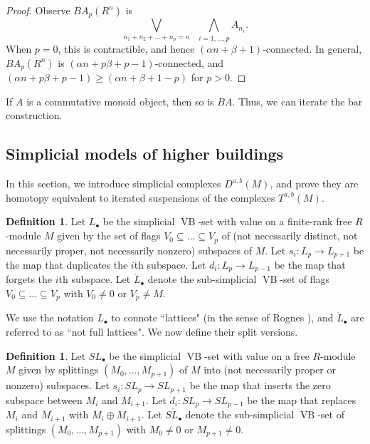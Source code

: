 \documentclass[a4paper]{amsart}
\DeclareMathOperator{\VB}{VB}
\newcommand{\m}{\to}
\numberwithin{theoremcounter}{section}
\theoremstyle{definition}
\newtheorem{definition}[Defauto]{Definition}
\theoremstyle{remark}
\begin{document}
\begin{proof} Observe $BA_{p}(R^n)$ is 
$$ \bigvee_{n_1 + n_2+ \dots + n_p=n} \; \; \bigwedge_{i=1, \dots, p} A_{n_i}.$$
When $p=0$, this is contractible, and hence $(\alpha n+\beta+1)$-connected. In general, $BA_{p}(R^n)$  is  $(\alpha n+p\beta+p-1)$-connected, and $(\alpha n+p\beta+p-1) \geq (\alpha n+\beta+1-p)$ for $p>0$. 
\end{proof} 


If $A$ is a commutative monoid object, then so is $BA$. Thus, we can iterate the bar construction.



\subsection{Simplicial models of higher buildings}

In this section, we introduce simplicial complexes $D^{a,b}(M)$, and prove they are homotopy equivalent to iterated suspensions of the complexes $T^{a,b}(M)$.
\begin{definition}
Let $L_\bullet$ be the simplicial $\VB$-set with value on a finite-rank free $R$-module $M$ given by the set of flags $V_0 \subseteq \dots \subseteq V_p $ of (not necessarily distinct, not necessarily proper, not necessarily nonzero) subspaces of $M$. Let $s_i\colon L_p \m L_{p+1}$ be the map that duplicates the $i$th subspace. Let $d_i\colon L_p \m L_{p-1}$ be the map that forgets the $i$th subspace.  Let $\mathring{L}_\bullet$ denote the sub-simplicial $\VB$-set of flags $V_0 \subseteq \dots \subseteq V_p $ with $V_0 \neq 0$ or $V_p \neq M$.  
\end{definition}

We use the notation $L_\bullet$ to connote ``lattices"  (in the sense of Rognes \cite{Rog1}), and $\mathring{L}_\bullet$  are referred to as ``not full lattices". We now define their split versions. 

\begin{definition}
Let $SL_\bullet$ be the simplicial $\VB$-set with value on a free $R$-module $M$ given by splittings $(M_0 , \dots , M_{p+1})$ of $M$ into (not necessarily proper or nonzero) subspaces. Let $s_i\colon SL_p \m SL_{p+1}$ be the map that inserts the zero subspace between $M_i$ and $M_{i+1}$. Let $d_i\colon SL_p \m SL_{p-1}$ be the map that replaces $M_i$ and $M_{i+1}$ with $M_i \oplus M_{i+1}$. Let $S\mathring{L}_\bullet$ denote the sub-simplicial $\VB$-set of splittings $(M_0, \dots,  M_{p+1} )$ with $M_0 \neq 0$ or $M_{p+1} \neq 0$.
\end{definition}
\end{document}
